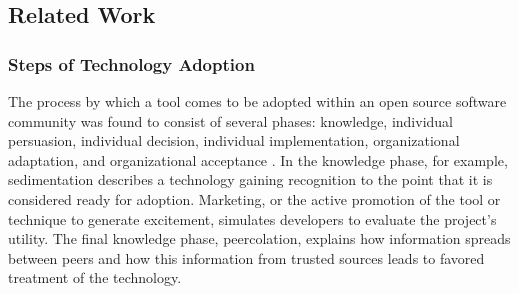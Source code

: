 \subsection{Related Work}
\subsubsection{Steps of Technology Adoption} %
\label{sec:tech-adoption}
The process by which a tool comes to be adopted within an open source software community was found to consist of several phases: knowledge, individual persuasion, individual decision, individual implementation, organizational adaptation, and organizational acceptance \cite{krafft:2016:free}. In the knowledge phase, for example, sedimentation describes a technology gaining recognition to the point that it is considered ready for adoption. Marketing, or the active promotion of the tool or technique to generate excitement, simulates developers to evaluate the project's utility. The final knowledge phase, peercolation, explains how information spreads between peers and how this information from trusted sources leads to favored treatment of the technology.



